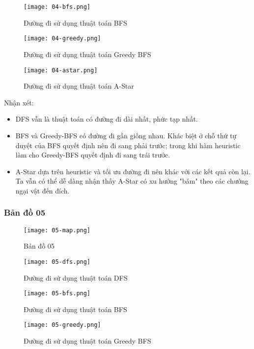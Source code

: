 \documentclass{article}
\begin{document}
\begin{figure}[H]
	\centering
	\texttt{[image: 04-bfs.png]}
	\caption{Đường đi sử dụng thuật toán BFS}
\end{figure}

\begin{figure}[H]
	\centering
	\texttt{[image: 04-greedy.png]}
	\caption{Đường đi sử dụng thuật toán Greedy BFS}
\end{figure}

\begin{figure}[H]
	\centering
	\texttt{[image: 04-astar.png]}
	\caption{Đường đi sử dụng thuật toán A-Star}
\end{figure}

Nhận xét:
\begin{itemize}
\item DFS vẫn là thuật toán có đường đi dài nhất, phức tạp nhất.
\item BFS và Greedy-BFS có đường đi gần giống nhau. Khác biệt ở chỗ thứ tự duyệt của BFS quyết định nên đi sang phải trước; trong khi hàm heuristic làm cho Greedy-BFS quyết định đi sang trái trước. 
\item A-Star dựa trên heuristic và tối ưu đường đi nên khác với các kết quả còn lại. Ta vẫn có thể dễ dàng nhận thấy A-Star có xu hướng "bám" theo các chướng ngại vật đến đích.
\end{itemize}

\subsubsection{Bản đồ 05}
\begin{figure}[H]
	\centering
	\texttt{[image: 05-map.png]}
	\caption{Bản đồ 05}
\end{figure}

\begin{figure}[H]
	\centering
	\texttt{[image: 05-dfs.png]}
	\caption{Đường đi sử dụng thuật toán DFS}
\end{figure}

\begin{figure}[H]
	\centering
	\texttt{[image: 05-bfs.png]}
	\caption{Đường đi sử dụng thuật toán BFS}
\end{figure}

\begin{figure}[H]
	\centering
	\texttt{[image: 05-greedy.png]}
	\caption{Đường đi sử dụng thuật toán Greedy BFS}
\end{figure}
\end{document}
